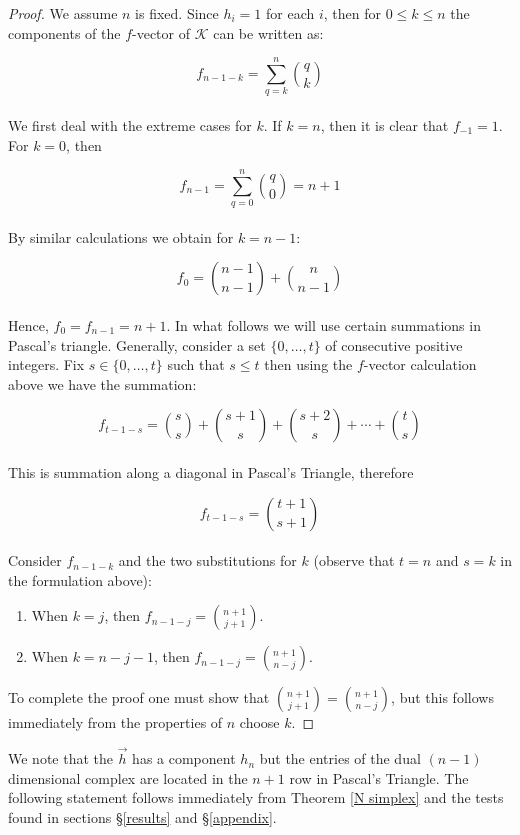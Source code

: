 \documentclass[oneside,12pt]{amsart}
\theoremstyle{definition}
\numberwithin{equation}{section}
\begin{document}
\begin{proof}
We assume $n$ is fixed.  Since $h_i = 1$ for each $i$, then for $0 \leq k \leq n$ the components of the
$f$-vector of $\mathcal{K}$ can be written as:

$$f_{n-1-k} = \sum_{q = k}^n \binom{q}{k}$$\\

We first deal with the extreme cases for $k$. If $k = n$, then it is clear that $f_{-1} = 1$.  For $k = 0$, then

$$f_{n-1} = \sum_{q = 0}^n \binom{q}{0} = n+1$$\\

By similar calculations we obtain for $k = n-1$:

$$f_0 = \binom{n-1}{n-1} + \binom{n}{n-1}$$\\

Hence, $f_0 = f_{n-1} = n+1$.  In what follows we will use certain summations in Pascal's triangle.  Generally, consider a set $\{0,\ldots,t\}$ of consecutive positive integers.  Fix $s \in \{0,\ldots,t\}$ such that $s \leq t $ then using the $f$-vector calculation above we have the summation:

$$f_{t-1-s} = \binom{s}{s} + \binom{s+1}{s} +\binom{s+2}{s} + \cdots + \binom{t}{s}$$\\

This is summation along a diagonal in Pascal's Triangle, therefore

$$f_{t-1-s} = \binom{t+1}{s+1}$$\\

Consider $f_{n-1-k}$ and the two substitutions for $k$ (observe that $t = n$ and $s = k$ in the formulation above):\\
\begin{enumerate}
  \item When $ k = j$, then $f_{n-1-j} =\displaystyle \binom{n+1}{j+1}$.\\
  \item When $ k= n-j-1$, then $f_{n-1-j} = \displaystyle\binom{n+1}{n-j}$.\\
\end{enumerate}

To complete the proof one must show that $\binom{n+1}{j+1} = \binom{n+1}{n-j}$, but this follows immediately from the properties of $n$ choose $k$.

\end{proof}

We note that the $\overrightarrow{h}$ has a component $h_n$ but the entries of the dual $(n-1)$ dimensional complex are located in the $n+1$ row in Pascal's Triangle.  The following statement
follows immediately from Theorem \ref{N simplex} and the tests found in sections \S\ref{results} and \S\ref{appendix}. %
\end{document}
